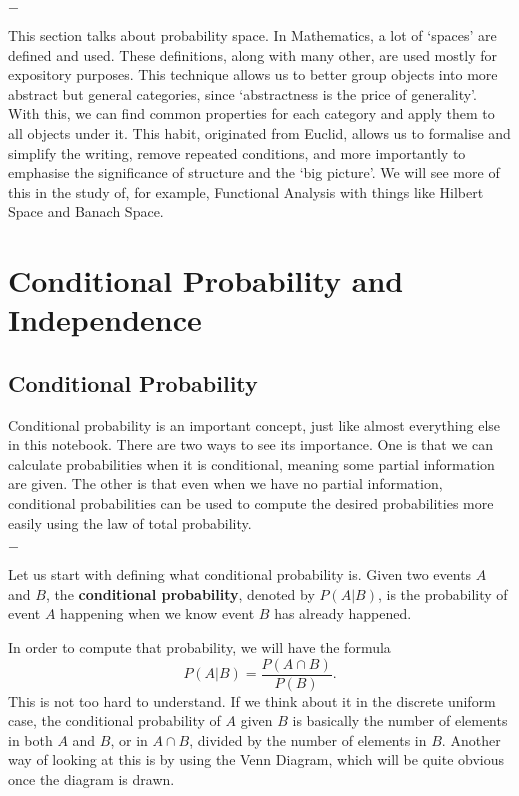 \documentclass[11pt, a4paper, oneside]{book}
\theoremstyle{definition}
\newcommand{\breaking}{%
    \begin{center}
    $-$
    \end{center}%
}
\begin{document}
\breaking

\noindent This section talks about probability space. In Mathematics, a lot of `spaces' are defined and used. These definitions, along with many other, are used mostly for expository purposes. This technique allows us to better group objects into more abstract but general categories, since `abstractness is the price of generality'. With this, we can find common properties for each category and apply them to all objects under it. This habit, originated from Euclid, allows us to formalise and simplify the writing, remove repeated conditions, and more importantly to emphasise the significance of structure and the `big picture'. We will see more of this in the study of, for example, Functional Analysis with things like Hilbert Space and Banach Space. 

\section{Conditional Probability and Independence}

\subsection{Conditional Probability}

Conditional probability is an important concept, just like almost everything else in this notebook. There are two ways to see its importance. One is that we can calculate probabilities when it is conditional, meaning some partial information are given. The other is that even when we have no partial information, conditional probabilities can be used to compute the desired probabilities more easily using the law of total probability.

\breaking

\noindent Let us start with defining what conditional probability is. Given two events $A$ and $B$, the \textbf{conditional probability}, denoted by $P(A|B)$, is the probability of event $A$ happening when we know event $B$ has already happened.

\noindent In order to compute that probability, we will have the formula \[
P(A|B) = \frac{P(A \cap B)}{P(B)}.
\]
This is not too hard to understand. If we think about it in the discrete uniform case, the conditional probability of $A$ given $B$ is basically the number of elements in both $A$ and $B$, or in $A \cap B$, divided by the number of elements in $B$. Another way of looking at this is by using the Venn Diagram, which will be quite obvious once the diagram is drawn. 
\end{document}
